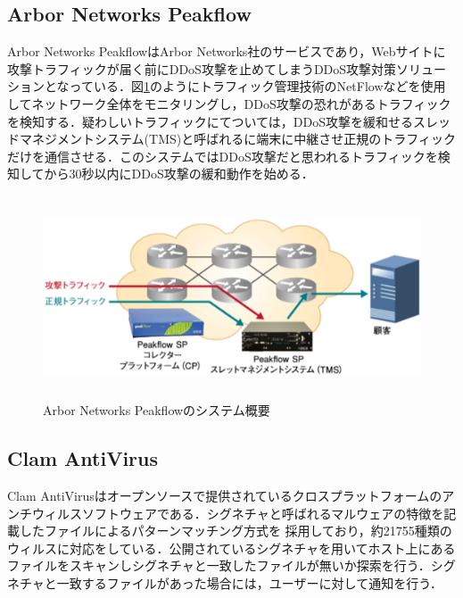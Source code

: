 \subsection{Arbor Networks Peakflow}
Arbor Networks PeakflowはArbor Networks社のサービスであり，Webサイトに攻撃トラフィックが届く前にDDoS攻撃を止めてしまうDDoS攻撃対策ソリューションとなっている\cite{Arbor}．図\ref{fig:arbsys}のようにトラフィック管理技術のNetFlowなどを使用してネットワーク全体をモニタリングし，DDoS攻撃の恐れがあるトラフィックを検知する．疑わしいトラフィックにてついては，DDoS攻撃を緩和せるスレッドマネジメントシステム(TMS)と呼ばれるに端末に中継させ正規のトラフィックだけを通信させる．このシステムではDDoS攻撃だと思われるトラフィックを検知してから30秒以内にDDoS攻撃の緩和動作を始める．
\begin{figure}[h]
    \centering
       \includegraphics[height=60mm]{figures/arbor.eps}
       \caption{Arbor Networks Peakflowのシステム概要\cite{ar}}
    \label{fig:arbsys}
    \end{figure}

\subsection{Clam AntiVirus}

Clam AntiVirus\cite{ClamAV}はオープンソースで提供されているクロスプラットフォームのアンチウィルスソフトウェアである．シグネチャと呼ばれるマルウェアの特徴を記載したファイルによるパターンマッチング方式を
採用しており，約21755種類のウィルスに対応をしている．公開されているシグネチャを用いてホスト上にあるファイルをスキャンしシグネチャと一致したファイルが無いか探索を行う．シグネチャと一致するファイルがあった場合には，ユーザーに対して通知を行う．
